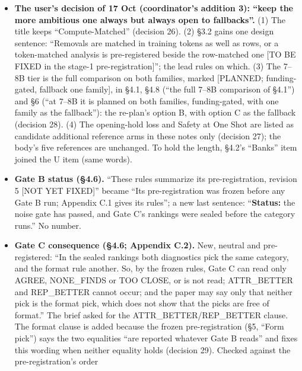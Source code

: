 \documentclass{article}
\theoremstyle{plain}
\theoremstyle{definition}
\theoremstyle{remark}
\begin{document}
\begin{itemize}
        result''. In these notes, decision 15 and risks 3, 21, 24 and 26 carry a
        revision-6 line; older history entries keep their words.
  \item \textbf{The user's decision of 17 Oct (coordinator's addition 3): ``keep
        the more ambitious one always but always open to fallbacks''.} (1) The
        title keeps ``Compute-Matched'' (decision 26). (2) \S{}3.2 gains one
        design sentence: ``Removals are matched in training tokens as well as
        rows, or a token-matched analysis is pre-registered beside the
        row-matched one [TO BE FIXED in the stage-1 pre-registration]''; the
        lead rules on which. (3) The 7--8B tier is the full comparison on both
        families, marked [PLANNED; funding-gated, fallback one family], in
        \S{}4.1, \S{}4.8 (``the full 7--8B comparison of \S{}4.1'') and \S{}6
        (``at 7--8B it is planned on both families, funding-gated, with one
        family as the fallback''): the re-plan's option B, with option C as the
        fallback (decision 28). (4) The opening-hold loss and Safety at One Shot
        are listed as candidate additional reference arms in these notes only
        (decision 27); the body's five references are unchanged. To hold the
        length, \S{}4.2's ``Banks'' item joined the U item (same words).
  \item \textbf{Gate B status (\S{}4.6).} ``These rules summarize its
        pre-registration, revision 5 [NOT YET FIXED]'' became ``Its
        pre-registration was frozen before any Gate B run; Appendix C.1 gives
        its rules''; a new last sentence: ``\textbf{Status:} the noise gate has
        passed, and Gate C's rankings were sealed before the category runs.'' No
        number.
  \item \textbf{Gate C consequence (\S{}4.6; Appendix C.2).} New, neutral and
        pre-registered: ``In the sealed rankings both diagnostics pick the same
        category, and the format rule another. So, by the frozen rules, Gate C
        can read only AGREE, NONE\_FINDS or TOO CLOSE, or is not read;
        ATTR\_BETTER and REP\_BETTER cannot occur; and the paper may say only
        that neither pick is the format pick, which does not show that the picks
        are free of format.'' The brief asked for the ATTR\_BETTER/REP\_BETTER
        clause. The format clause is added because the frozen pre-registration
        (\S{}5, ``Form pick'') says the two equalities ``are reported whatever
        Gate B reads'' and fixes this wording when neither equality holds
        (decision 29). Checked against the pre-registration's order

\end{itemize}
\end{document}
